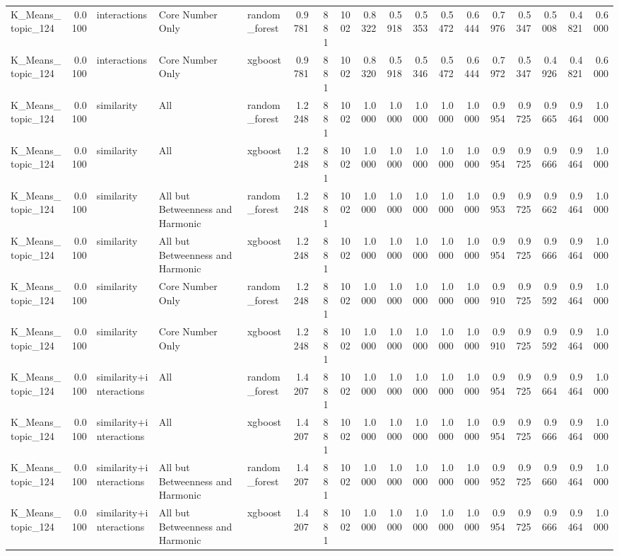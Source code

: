 \begin{tabular}{lrlllrrrrrrrrrrrrr}
K_Means_topic_124 & 0.0100 & interactions & Core Number Only & random_forest & 0.9781 & 881 & 1002 & 0.8322 & 0.5918 & 0.5353 & 0.5472 & 0.6444 & 0.7976 & 0.5347 & 0.5008 & 0.4821 & 0.6000 \\
K_Means_topic_124 & 0.0100 & interactions & Core Number Only & xgboost & 0.9781 & 881 & 1002 & 0.8320 & 0.5918 & 0.5346 & 0.5472 & 0.6444 & 0.7972 & 0.5347 & 0.4926 & 0.4821 & 0.6000 \\
K_Means_topic_124 & 0.0100 & similarity & All & random_forest & 1.2248 & 881 & 1002 & 1.0000 & 1.0000 & 1.0000 & 1.0000 & 1.0000 & 0.9954 & 0.9725 & 0.9665 & 0.9464 & 1.0000 \\
K_Means_topic_124 & 0.0100 & similarity & All & xgboost & 1.2248 & 881 & 1002 & 1.0000 & 1.0000 & 1.0000 & 1.0000 & 1.0000 & 0.9954 & 0.9725 & 0.9666 & 0.9464 & 1.0000 \\
K_Means_topic_124 & 0.0100 & similarity & All but Betweenness and Harmonic & random_forest & 1.2248 & 881 & 1002 & 1.0000 & 1.0000 & 1.0000 & 1.0000 & 1.0000 & 0.9953 & 0.9725 & 0.9662 & 0.9464 & 1.0000 \\
K_Means_topic_124 & 0.0100 & similarity & All but Betweenness and Harmonic & xgboost & 1.2248 & 881 & 1002 & 1.0000 & 1.0000 & 1.0000 & 1.0000 & 1.0000 & 0.9954 & 0.9725 & 0.9666 & 0.9464 & 1.0000 \\
K_Means_topic_124 & 0.0100 & similarity & Core Number Only & random_forest & 1.2248 & 881 & 1002 & 1.0000 & 1.0000 & 1.0000 & 1.0000 & 1.0000 & 0.9910 & 0.9725 & 0.9592 & 0.9464 & 1.0000 \\
K_Means_topic_124 & 0.0100 & similarity & Core Number Only & xgboost & 1.2248 & 881 & 1002 & 1.0000 & 1.0000 & 1.0000 & 1.0000 & 1.0000 & 0.9910 & 0.9725 & 0.9592 & 0.9464 & 1.0000 \\
K_Means_topic_124 & 0.0100 & similarity+interactions & All & random_forest & 1.4207 & 881 & 1002 & 1.0000 & 1.0000 & 1.0000 & 1.0000 & 1.0000 & 0.9954 & 0.9725 & 0.9664 & 0.9464 & 1.0000 \\
K_Means_topic_124 & 0.0100 & similarity+interactions & All & xgboost & 1.4207 & 881 & 1002 & 1.0000 & 1.0000 & 1.0000 & 1.0000 & 1.0000 & 0.9954 & 0.9725 & 0.9666 & 0.9464 & 1.0000 \\
K_Means_topic_124 & 0.0100 & similarity+interactions & All but Betweenness and Harmonic & random_forest & 1.4207 & 881 & 1002 & 1.0000 & 1.0000 & 1.0000 & 1.0000 & 1.0000 & 0.9952 & 0.9725 & 0.9660 & 0.9464 & 1.0000 \\
K_Means_topic_124 & 0.0100 & similarity+interactions & All but Betweenness and Harmonic & xgboost & 1.4207 & 881 & 1002 & 1.0000 & 1.0000 & 1.0000 & 1.0000 & 1.0000 & 0.9954 & 0.9725 & 0.9666 & 0.9464 & 1.0000 \\

\end{tabular}
